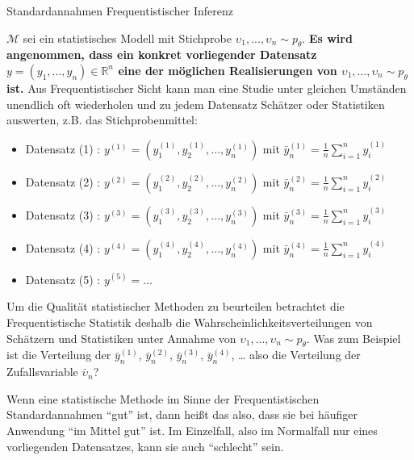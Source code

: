 \documentclass[
  8pt,
  ignorenonframetext,
]{beamer}
\newcommand{\ups} {\upsilon}
\begin{document}
\begin{frame}{}
\protect\hypertarget{section-4}{}
Standardannahmen Frequentistischer Inferenz

\footnotesize

\(\mathcal{M}\) sei ein statistisches Modell mit Stichprobe
\(\ups_1,...,\ups_n \sim p_\theta\). \textbf{Es wird angenommen, dass
ein konkret vorliegender Datensatz
\(y = (y_1,...,y_n) \in \mathbb{R}^n\) eine der möglichen Realisierungen
von \(\ups_1,...,\ups_n \sim p_\theta\) ist.} Aus Frequentistischer
Sicht kann man eine Studie unter gleichen Umständen unendlich oft
wiederholen und zu jedem Datensatz Schätzer oder Statistiken auswerten,
z.B. das Stichprobenmittel:

\footnotesize
\begin{itemize}
\item[] Datensatz (1) : $y^{(1)} = \left(y_1^{(1)}, y_2^{(1)}, ...,y_n^{(1)}\right)$
                        mit $\bar{y}_n^{(1)} = \frac{1}{n}\sum_{i=1}^n y_i^{(1)}$
\item[] Datensatz (2) : $y^{(2)} = \left(y_1^{(2)}, y_2^{(2)}, ...,y_n^{(2)}\right)$
                        mit $\bar{y}_n^{(2)} = \frac{1}{n}\sum_{i=1}^n y_i^{(2)}$
\item[] Datensatz (3) : $y^{(3)} = \left(y_1^{(3)}, y_2^{(3)}, ...,y_n^{(3)}\right)$
                        mit $\bar{y}_n^{(3)} = \frac{1}{n}\sum_{i=1}^n y_i^{(3)}$
\item[] Datensatz (4) : $y^{(4)} = \left(y_1^{(4)}, y_2^{(4)}, ...,y_n^{(4)}\right)$
                        mit $\bar{y}_n^{(4)} = \frac{1}{n}\sum_{i=1}^n y_i^{(4)}$
\item[] Datensatz (5) : $y^{(5)} = ...$
\end{itemize}

Um die Qualität statistischer Methoden zu beurteilen betrachtet die
Frequentistische Statistik deshalb die Wahrscheinlichkeitsverteilungen
von Schätzern und Statistiken unter Annahme von
\(\ups_1,...,\ups_n \sim p_\theta\). Was zum Beispiel ist die Verteilung
der \(\bar{y}_n^{(1)}\), \(\bar{y}_n^{(2)}\), \(\bar{y}_n^{(3)}\),
\(\bar{y}_n^{(4)}\), \ldots{} also die Verteilung der Zufallsvariable
\(\bar{\ups}_n\)?

Wenn eine statistische Methode im Sinne der Frequentistischen
Standardannahmen ``gut'' ist, dann heißt das also, dass sie bei häufiger
Anwendung ``im Mittel gut'' ist. Im Einzelfall, also im Normalfall nur
eines vorliegenden Datensatzes, kann sie auch ``schlecht'' sein.
\end{frame}
\end{document}
